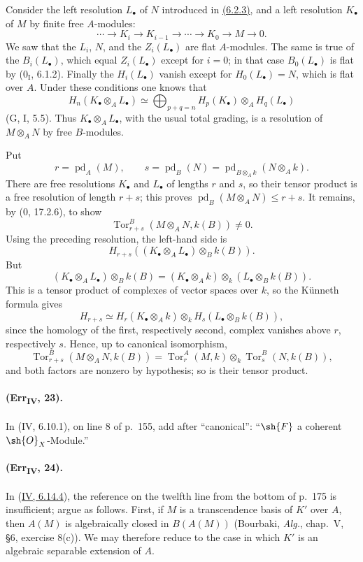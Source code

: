 Consider the left resolution $L_\bullet$ of $N$ introduced in {\hyperlink{ega4.c04.prop.6-2-3}{(6.2.3)}},
and a left resolution $K_\bullet$ of $M$ by finite free $A$-modules:
\[
 \cdots\longrightarrow K_i\longrightarrow K_{i-1}\longrightarrow
 \cdots\longrightarrow K_0\longrightarrow M\longrightarrow0.
\]
We saw that the $L_i$, $N$, and the $Z_i(L_\bullet)$ are flat
$A$-modules.  The same is true of the $B_i(L_\bullet)$, which equal
$Z_i(L_\bullet)$ except for $i=0$; in that case $B_0(L_\bullet)$ is flat
by ($0_{\mathrm I}$, 6.1.2).  Finally the $H_i(L_\bullet)$ vanish except
for $H_0(L_\bullet)=N$, which is flat over $A$.  Under these conditions
one knows that
\[
 H_n(K_\bullet\otimes_AL_\bullet)\simeq
 \bigoplus_{p+q=n}H_p(K_\bullet)\otimes_AH_q(L_\bullet)
\]
(G, I, 5.5).  Thus $K_\bullet\otimes_AL_\bullet$, with the usual total
grading, is a resolution of $M\otimes_AN$ by free $B$-modules.

Put
\[
 r=\operatorname{pd}_A(M),\qquad
 s=\operatorname{pd}_B(N)=
   \operatorname{pd}_{B\otimes_Ak}(N\otimes_Ak).
\]
There are free resolutions $K_\bullet$ and $L_\bullet$ of lengths $r$
and $s$, so their tensor product is a free resolution of length $r+s$;
this proves
$\operatorname{pd}_B(M\otimes_AN)\leq r+s$.  It remains, by
($0$, 17.2.6), to show
\[
 \operatorname{Tor}^{B}_{r+s}(M\otimes_AN,k(B))\neq0.
\]
Using the preceding resolution, the left-hand side is
\[
 H_{r+s}((K_\bullet\otimes_AL_\bullet)\otimes_Bk(B)).
\]
But
\[
 (K_\bullet\otimes_AL_\bullet)\otimes_Bk(B)
 = (K_\bullet\otimes_Ak)\otimes_k
   (L_\bullet\otimes_Bk(B)).
\]
This is a tensor product of complexes of vector spaces over $k$, so the
K\"unneth formula gives
\[
 H_{r+s}\simeq H_r(K_\bullet\otimes_Ak)\otimes_k
 H_s(L_\bullet\otimes_Bk(B)),
\]
since the homology of the first, respectively second, complex vanishes
above $r$, respectively $s$.  Hence, up to canonical isomorphism,
\[
 \operatorname{Tor}^{B}_{r+s}(M\otimes_AN,k(B))=
 \operatorname{Tor}^{A}_{r}(M,k)\otimes_k
 \operatorname{Tor}^{B}_{s}(N,k(B)),
\]
and both factors are nonzero by hypothesis; so is their tensor product.

\paragraph{(Err\textsubscript{IV}, 23).}
In (IV, 6.10.1), on line 8 of p.~155, add after ``canonical'':
``$\sh{F}$ a coherent $\sh{O}_X$-Module.''

\paragraph{(Err\textsubscript{IV}, 24).}
In ({\hyperlink{ega4.c04.prop.6-14-4}{IV, 6.14.4}}), the reference on the twelfth line from the bottom of
p.~175 is insufficient; argue as follows.  First, if $M$ is a
transcendence basis of $K'$ over $A$, then $A(M)$ is algebraically closed
in $B(A(M))$ (Bourbaki, \emph{Alg.}, chap.~V, \S6, exercise 8(c)).  We
may therefore reduce to the case in which $K'$ is an algebraic separable
extension of $A$.

